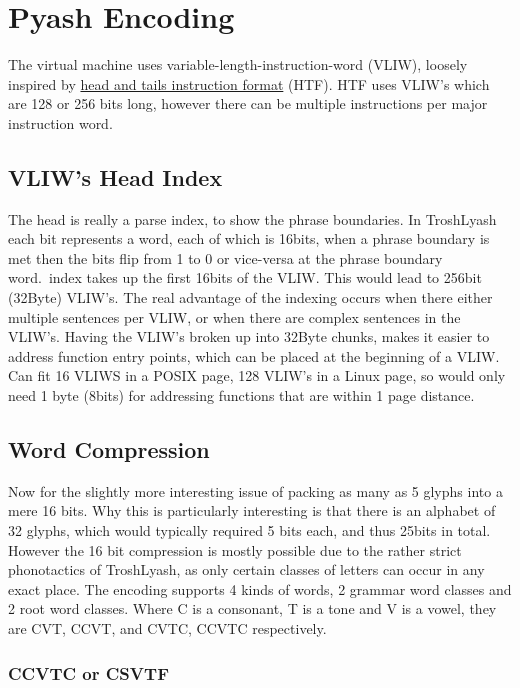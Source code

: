 \documentclass[12pt]{report}
\begin{document}
\chapter{Pyash Encoding}

The virtual machine uses variable-length-instruction-word (VLIW),
loosely inspired by
\href{http://scale.eecs.berkeley.edu/papers/hat-cases2001.pdf}{head and
tails instruction format} (HTF). HTF uses VLIW's which are 128 or 256
bits long, however there can be multiple instructions per major
instruction word.

\section{VLIW's Head Index}\label{vliws-head-index}

The head is really a parse index, to show the phrase boundaries. In
TroshLyash each bit represents a word, each of which is 16bits, when a
phrase boundary is met then the bits flip from 1 to 0 or vice-versa at
the phrase boundary word.\ index takes up the first 16bits of the VLIW\@.
This would lead to 256bit (32Byte) VLIW's. The real advantage of the
indexing occurs when there either multiple sentences per VLIW, or when
there are complex sentences in the VLIW's. Having the VLIW's broken up
into 32Byte chunks, makes it easier to address function entry points,
which can be placed at the beginning of a VLIW\@. Can fit 16 VLIWS in a
POSIX page, 128 VLIW's in a Linux page, so would only need 1 byte
(8bits) for addressing functions that are within 1 page distance.

\section{Word Compression}\label{word-compression}

Now for the slightly more interesting issue of packing as many as 5
glyphs into a mere 16 bits. Why this is particularly interesting is that
there is an alphabet of 32 glyphs, which would typically required 5 bits
each, and thus 25bits in total. However the 16 bit compression is mostly
possible due to the rather strict phonotactics of TroshLyash, as only
certain classes of letters can occur in any exact place. The encoding
supports 4 kinds of words, 2 grammar word classes and 2 root word
classes. Where C is a consonant, T is a tone and V is a vowel, they are
CVT, CCVT, and CVTC, CCVTC respectively.

\subsection{CCVTC or CSVTF}\label{ccvtc-or-csvtf}
\end{document}
